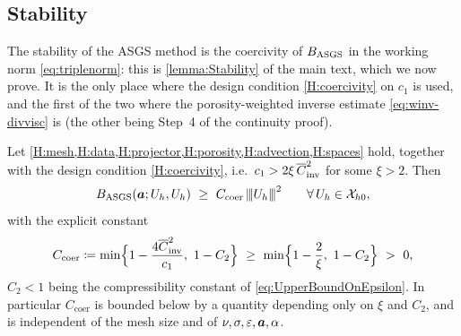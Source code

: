 \subsection{Stability}\label{sec:coercivity}
The stability of the ASGS method is the coercivity of $B_{\mathrm{ASGS}} $ in the working norm
\eqref{eq:triplenorm}: this is \cref{lemma:Stability} of the main text, which we now prove. It
is the only place where the design condition \cref{H:coercivity} on $c_1$ is used, and the first
of the two where the porosity{\hyp}weighted inverse estimate \eqref{eq:winv-divvisc} is (the
other being Step~4 of the continuity proof).

\begin{lemma}[Coercivity]\label{lem:coercivity}
Let \cref{H:mesh,H:data,H:projector,H:porosity,H:advection,H:spaces} hold, together with the design
condition \cref{H:coercivity}, i.e.\ $c_1 > 2\xi\,\overline{C}_{\mathrm{inv}}^2$ for some $\xi>2$. Then
\begin{equation}\label{eq:coercivity}
  B_{\mathrm{ASGS}} (\boldsymbol{a}; U_h,U_h) \ \ge\ C_{\mathrm{coer}}\,{\lvert\kern-0.25ex\lvert\kern-0.25ex\lvert U_h \rvert\kern-0.25ex\rvert\kern-0.25ex\rvert}^2
  \qquad\forall\,U_h\in\mathcal{X}_{h0} ,
\end{equation}
with the explicit constant
\begin{equation}\label{eq:coerconstant}
  C_{\mathrm{coer}} \coloneqq \min\Bigl\{1-\frac{4\Cinva^2}{c_1},\ 1-C_2\Bigr\}
  \ \ge\ \min\Bigl\{1-\frac{2}{\xi},\ 1-C_2\Bigr\} \ >\ 0 ,
\end{equation}
$C_2<1$ being the compressibility constant of \eqref{eq:UpperBoundOnEpsilon}. In particular
$C_{\mathrm{coer}}$ is bounded below by a quantity depending only on $\xi$ and $C_2$, and is
independent of the mesh size and of $\nu,\sigma,\varepsilon,\boldsymbol{a},\alpha$.
\end{lemma}

